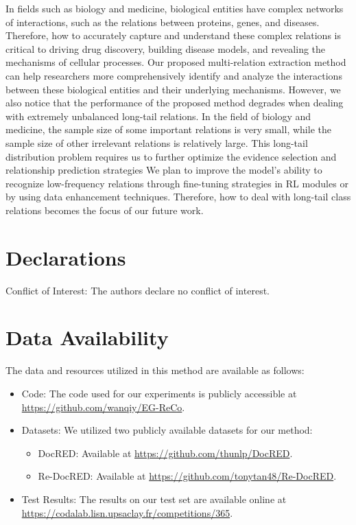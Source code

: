\documentclass[preprint,12pt]{elsarticle}
\begin{document}
In fields such as biology and medicine, biological entities have complex networks of interactions, such as the relations between proteins, genes, and diseases. Therefore, how to accurately capture and understand these complex relations is critical to driving drug discovery, building disease models, and revealing the mechanisms of cellular processes. Our proposed multi-relation extraction method can help researchers more comprehensively identify and analyze the interactions between these biological entities and their underlying mechanisms. However, we also notice that the performance of the proposed method degrades when dealing with extremely unbalanced long-tail relations. In the field of biology and medicine, the sample size of some important relations is very small, while the sample size of other irrelevant relations is relatively large. This long-tail distribution problem requires us to further optimize the evidence selection and relationship prediction strategies We plan to improve the model's ability to recognize low-frequency relations through fine-tuning strategies in RL modules or by using data enhancement techniques. Therefore, how to deal with long-tail class relations becomes the focus of our future work. 

\section*{Declarations}

Conflict of Interest: The authors declare no conflict of interest.

\section{Data Availability}
The data and resources utilized in this method are available as follows:

\begin{itemize}
    \item Code: The code used for our experiments is publicly accessible at \url{https://github.com/wanqiy/EG-ReCo}.
    \item Datasets: We utilized two publicly available datasets for our method:
    \begin{itemize}
        \item DocRED: Available at \url{https://github.com/thunlp/DocRED}.
        \item Re-DocRED: Available at \url{https://github.com/tonytan48/Re-DocRED}.
    \end{itemize}
    \item Test Results: The results on our test set are available online at \url{https://codalab.lisn.upsaclay.fr/competitions/365}.
\end{itemize}
\end{document}
